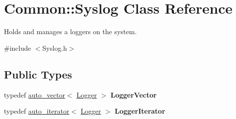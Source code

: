\hypertarget{class_common_1_1_syslog}{\section{Common\-:\-:Syslog Class Reference}
\label{class_common_1_1_syslog}
}


Holds and manages a loggers on the system.  




{\ttfamily \#include $<$Syslog.\-h$>$}

\subsection*{Public Types}
\begin{DoxyCompactItemize}
\item 
\hypertarget{class_common_1_1_syslog_a96209c74bb11c81c5c887faf4979156e}{typedef \hyperlink{classauto__vector}{auto\-\_\-vector}$<$ \hyperlink{class_common_1_1_logger}{Logger} $>$ {\bfseries Logger\-Vector}}\label{class_common_1_1_syslog_a96209c74bb11c81c5c887faf4979156e}

\item 
\hypertarget{class_common_1_1_syslog_a387d7133565b639dcf9310e003c85e5c}{typedef \hyperlink{classauto__iterator}{auto\-\_\-iterator}$<$ \hyperlink{class_common_1_1_logger}{Logger} $>$ {\bfseries Logger\-Iterator}}\label{class_common_1_1_syslog_a387d7133565b639dcf9310e003c85e5c}

\end{DoxyCompactItemize}
